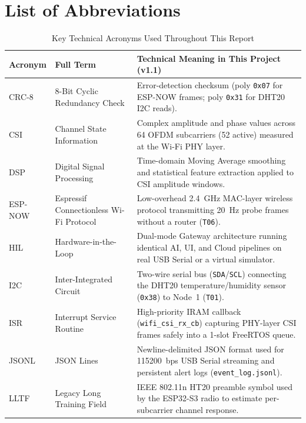 \documentclass{hcmut-report}
\renewcommand{\arraystretch}{1.24}
\begin{document}
\newpage
\tableofcontents
\newpage

\section*{List of Abbreviations}
\vspace{-0.3cm}
\begin{table}[H]
\centering
\caption{Key Technical Acronyms Used Throughout This Report}
\label{tab:abbreviations}
\scriptsize
\renewcommand{\arraystretch}{1.02}
\begin{tabularx}{\textwidth}{|P{2.2cm}|P{4.8cm}|Y|}
\hline
\textbf{Acronym} & \textbf{Full Term} & \textbf{Technical Meaning in This Project (v1.1)} \\
\hline
CRC-8 & 8-Bit Cyclic Redundancy Check & Error-detection checksum (poly \texttt{0x07} for ESP-NOW frames; poly \texttt{0x31} for DHT20 I2C reads). \\
\hline
CSI & Channel State Information & Complex amplitude and phase values across 64 OFDM subcarriers (52 active) measured at the Wi-Fi PHY layer. \\
\hline
DSP & Digital Signal Processing & Time-domain Moving Average smoothing and statistical feature extraction applied to CSI amplitude windows. \\
\hline
ESP-NOW & Espressif Connectionless Wi-Fi Protocol & Low-overhead 2.4~GHz MAC-layer wireless protocol transmitting 20~Hz probe frames without a router (\texttt{T06}). \\
\hline
HIL & Hardware-in-the-Loop & Dual-mode Gateway architecture running identical AI, UI, and Cloud pipelines on real USB Serial or a virtual simulator. \\
\hline
I2C & Inter-Integrated Circuit & Two-wire serial bus (\texttt{SDA}/\texttt{SCL}) connecting the DHT20 temperature/humidity sensor (\texttt{0x38}) to Node~1 (\texttt{T01}). \\
\hline
ISR & Interrupt Service Routine & High-priority IRAM callback (\texttt{wifi\_csi\_rx\_cb}) capturing PHY-layer CSI frames safely into a 1-slot FreeRTOS queue. \\
\hline
JSONL & JSON Lines & Newline-delimited JSON format used for 115200~bps USB Serial streaming and persistent alert logs (\texttt{event\_log.jsonl}). \\
\hline
LLTF & Legacy Long Training Field & IEEE 802.11n HT20 preamble symbol used by the ESP32-S3 radio to estimate per-subcarrier channel response. \\

\end{tabularx}
\end{table}
\end{document}
